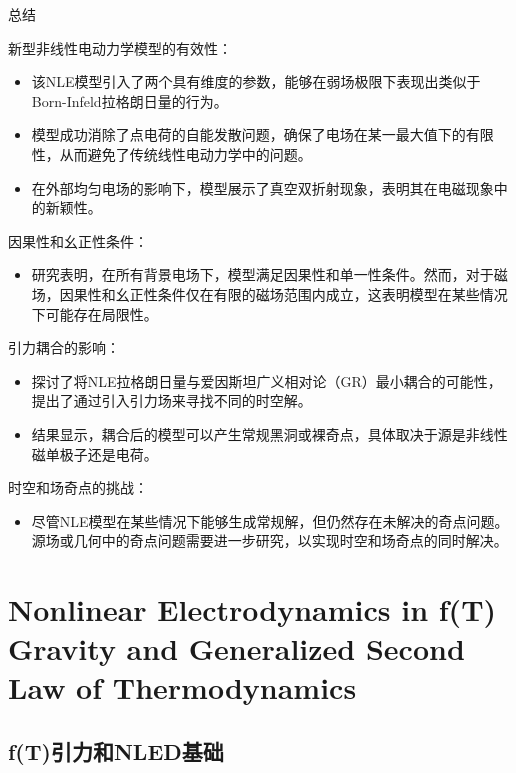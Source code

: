 \documentclass[9pt, dvipsnames]{beamer} %
\begin{document}
\begin{frame}{总结}

    新型非线性电动力学模型的有效性：
\begin{itemize}
    \item 该NLE模型引入了两个具有维度的参数，能够在弱场极限下表现出类似于Born-Infeld拉格朗日量的行为。

    \item 模型成功消除了点电荷的自能发散问题，确保了电场在某一最大值下的有限性，从而避免了传统线性电动力学中的问题。
    
    \item 在外部均匀电场的影响下，模型展示了真空双折射现象，表明其在电磁现象中的新颖性。
\end{itemize}

因果性和幺正性条件：

\begin{itemize}
    \item 研究表明，在所有背景电场下，模型满足因果性和单一性条件。然而，对于磁场，因果性和幺正性条件仅在有限的磁场范围内成立，这表明模型在某些情况下可能存在局限性。
\end{itemize}

引力耦合的影响：

\begin{itemize}
    \item 探讨了将NLE拉格朗日量与爱因斯坦广义相对论（GR）最小耦合的可能性，提出了通过引入引力场来寻找不同的时空解。

    \item 结果显示，耦合后的模型可以产生常规黑洞或裸奇点，具体取决于源是非线性磁单极子还是电荷。
\end{itemize}


时空和场奇点的挑战：

\begin{itemize}
    \item 尽管NLE模型在某些情况下能够生成常规解，但仍然存在未解决的奇点问题。源场或几何中的奇点问题需要进一步研究，以实现时空和场奇点的同时解决。
\end{itemize}
\end{frame}

\section{Nonlinear Electrodynamics in f(T) Gravity and Generalized Second Law of Thermodynamics}



\subsection{f(T)引力和NLED基础}
\end{document}
